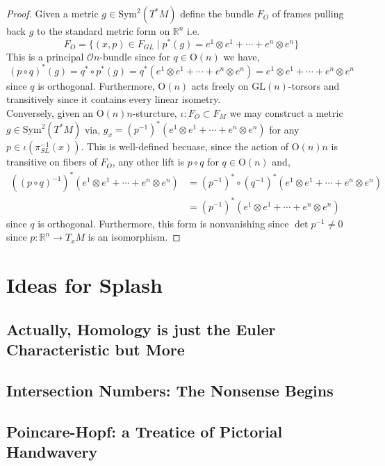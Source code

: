 \documentclass[12pt]{extarticle}
\newcommand{\R}{\mathbb{R}}
\theoremstyle{definition}
\renewcommand{\O}{\mathcal{O}}
\newcommand{\GL}[1]{\mathrm{GL}\left(#1\right)}
\newcommand{\Orth}[1]{\mathrm{O}\left(#1\right)}
\begin{document}
\begin{proof}
Given a metric $g \in \mathrm{Sym}^2(T^*M)$ define the bundle $F_{O}$ of frames pulling back $g$ to the standard metric form on $\R^n$ i.e. 
\[ F_{O} = \{ (x, p) \in F_{GL} \mid p^*(g) = e^1 \otimes e^1 + \cdots + e^n \otimes e^n \} \]
This is a principal $\O{n}$-bundle since for $q \in \Orth{n}$ we have,
\[ (p \circ q)^*(g) = q^* \circ p^*(g) = q^*(e^1 \otimes e^1 + \cdots + e^n \otimes e^n) = e^1 \otimes e^1 + \cdots + e^n \otimes e^n \]
since $q$ is orthogonal. Furthermore, $\Orth{n}$ acts freely on $\GL{n}$-torsors and transitively since it contains every linear isometry. 
\bigskip\\
Conversely, given an $\Orth{n}{n}$-sturcture, $\iota: F_{O} \subset F_{M}$ we may construct a metric $g \in \mathrm{Sym}^2(T^*M)$ via, $g_x = (p^{-1})^*(e^1 \otimes e^1 + \cdots + e^n \otimes e^n)$ for any $p \in \iota(\pi_{SL}^{-1}(x))$. This is well-defined becuase, since the action of $\Orth{n}{n}$ is transitive on fibers of $F_{O}$, any other lift is $p \circ q$ for $q \in \Orth{n}$ and,
\begin{align*}
((p \circ q)^{-1})^*(e^1 \otimes e^1 + \cdots + e^n \otimes e^n) & = (p^{-1})^* \circ (q^{-1})^*(e^1 \otimes e^1 + \cdots + e^n \otimes e^n) 
\\
& = (p^{-1})^*(e^1 \otimes e^1 + \cdots + e^n \otimes e^n)
\end{align*}
since $q$ is orthogonal. Furthermore, this form is nonvanishing since $\det{p^{-1}} \neq 0$ since $p : \R^n \to T_x M$ is an isomorphism. 
\end{proof}

\section{Ideas for Splash}

\subsection{Actually, Homology is just the Euler Characteristic but More}

\subsection{Intersection Numbers: The Nonsense Begins}

\subsection{Poincare-Hopf: a Treatice of Pictorial Handwavery}
\end{document}
